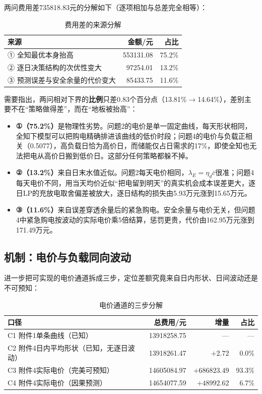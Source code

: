 \documentclass[UTF8,12pt]{ctexart}
\begin{document}
两问费用差735818.83元的分解如下（逐项相加与总差完全相等）：
\begin{table}[H]\centering
\caption{费用差的来源分解}
\begin{tabular}{lrr}\toprule
来源 & 金额/元 & 占比\\\midrule
① 全知最优本身抬高 & 553131.08 & 75.2\%\\
② 逐日决策结构的次优性变大 & 97254.01 & 13.2\%\\
③ 预测误差与安全余量的代价变大 & 85433.75 & 11.6\%\\\bottomrule
\end{tabular}
\end{table}

需要指出，两问相对下界的\textbf{比例}只差0.83个百分点（13.81\%$\to$14.64\%），差别主要不在“策略做得差”，而在“地板被抬高”：
\begin{itemize}
\item \textbf{①（75.2\%）}是物理性劣势。问题2的电价是单一固定曲线，每天形状相同，全知下模型可以把购电精确排进该曲线的低价时段；问题4的电价与负载正相关（0.5077），高负载日恰为高价日，而储能仅占日需求的17\%，即使全知也无法把电从高价日搬到低价日。这部分任何策略都躲不掉。
\item \textbf{②（13.2\%）}来自日末水值近似。问题2每天电价相同，$\lambda_E=\eta_d\bar c$很准；问题4每天电价不同，用当天均价近似“把电留到明天”的真实机会成本误差更大，逐日LP的充放电取舍偏差被放大，逐日结构的损失由5.93万元涨到15.65万元。
\item \textbf{③（11.6\%）}来自误差穿透余量后的紧急购电。安全余量与电价无关，但问题4中紧急购电按波动的实际电价乘5倍结算，惩罚更贵，代价由162.95万元涨到171.49万元。
\end{itemize}

\subsection{机制：电价与负载同向波动}
进一步把可实现的电价通道拆成三步，定位差额究竟来自日内形状、日间波动还是不可预知：
\begin{table}[H]\centering
\caption{电价通道的三步分解}
\begin{tabular}{lrrr}\toprule
口径 & 总费用/元 & 增量 & 占比\\\midrule
C1 附件1单条曲线（已知） & 13918258.75 & --- & ---\\
C2 附件4日内平均形状（已知，无逐日波动） & 13918261.47 & $+2.72$ & 0.0\%\\
C3 附件4实际电价（完美可预知） & 14605084.97 & $+686823.49$ & 93.3\%\\
C4 附件4实际电价（因果预测） & 14654077.59 & $+48992.62$ & 6.7\%\\\bottomrule
\end{tabular}
\end{table}
\end{document}
